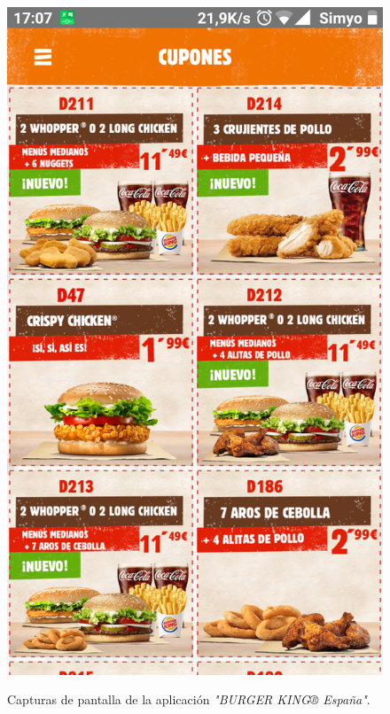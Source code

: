 \documentclass[twoside]{report}
\begin{document}
\begin{figure}[H]
\begin{center}
\includegraphics[scale=0.10]{images/restaurantes/burry1.png}
\caption{Capturas de pantalla de la aplicación \textit{"BURGER KING® España"}.} \cite{burgerk}
\end{center}
\end{figure}
\end{document}
